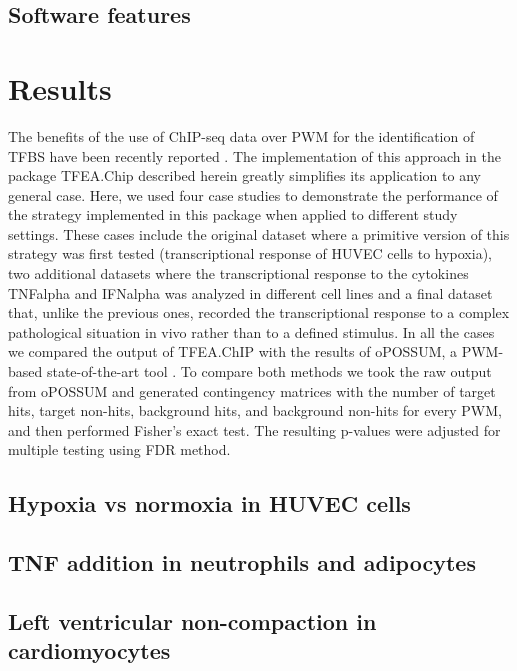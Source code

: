 \documentclass[10pt,letterpaper]{article}
\begin{document}
	\subsection*{Software features}
	
	\section*{Results}
	The benefits of the use of ChIP-seq data over PWM for the identification of TFBS have been recently reported \cite{Tiana2018a}. The implementation of this approach in the package TFEA.Chip described herein greatly simplifies its application to any general case. Here, we used four case studies to demonstrate the performance of the strategy implemented in this package when applied to different study settings. These cases include the original dataset where a primitive version of this strategy was first tested (transcriptional response of HUVEC cells to hypoxia), two additional datasets where the transcriptional response to the cytokines TNFalpha and IFNalpha was analyzed in different cell lines and a final dataset that, unlike the previous ones, recorded the transcriptional response to a complex pathological situation in vivo rather than to a defined stimulus. In all the cases we compared the output of TFEA.ChIP with the results of oPOSSUM, a PWM-based state-of-the-art tool \cite{Kwon2012}. To compare both methods we took the raw output from oPOSSUM and generated contingency matrices with the number of target hits, target non-hits, background hits, and background non-hits for every PWM, and then performed Fisher’s exact test. The resulting p-values were adjusted for multiple testing using FDR method.
	
	\subsection{Hypoxia vs normoxia in HUVEC cells}
	
	\subsection{TNF addition in neutrophils and adipocytes}
	
	\subsection{Left ventricular non-compaction in cardiomyocytes}
	
\end{document}
